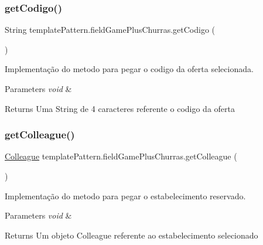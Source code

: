 \subsubsection{\texorpdfstring{getCodigo()}{getCodigo()}}
{\footnotesize\ttfamily String template\+Pattern.\+field\+Game\+Plus\+Churras.\+get\+Codigo (\begin{DoxyParamCaption}{ }\end{DoxyParamCaption})}



Implementação do metodo para pegar o codigo da oferta selecionada. 


\begin{DoxyParams}{Parameters}
{\em void} & \\
\hline
\end{DoxyParams}
\begin{DoxyReturn}{Returns}
Uma String de 4 caracteres referente o codigo da oferta 
\end{DoxyReturn}
\mbox{\label{classtemplate_pattern_1_1field_game_plus_churras_a4c2144d5198da5c6d34a9ef472280af4}} 
\subsubsection{\texorpdfstring{getColleague()}{getColleague()}}
{\footnotesize\ttfamily \mbox{\hyperlink{classmediator_pattern_1_1_colleague}{Colleague}} template\+Pattern.\+field\+Game\+Plus\+Churras.\+get\+Colleague (\begin{DoxyParamCaption}{ }\end{DoxyParamCaption})}



Implementação do metodo para pegar o estabelecimento reservado. 


\begin{DoxyParams}{Parameters}
{\em void} & \\
\hline
\end{DoxyParams}
\begin{DoxyReturn}{Returns}
Um objeto Colleague referente ao estabelecimento selecionado 
\end{DoxyReturn}
\mbox{\label{classtemplate_pattern_1_1field_game_plus_churras_a6174115fbf509d450004d2f6e57bd754}} 

